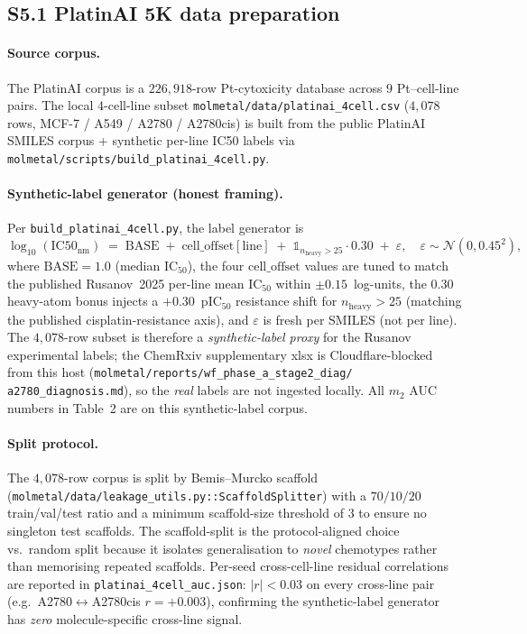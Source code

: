 \subsection*{S5.1 PlatinAI 5K data preparation}
\label{supp:s5-platinai}

\paragraph{Source corpus.}
The PlatinAI corpus \citep{rusanov2025platinai} is a
$226{,}918$-row Pt-cytoxicity database across $9$ Pt--cell-line
pairs.  The local $4$-cell-line subset
\texttt{molmetal/data/platinai\_4cell.csv} ($4{,}078$ rows,
MCF-7 / A549 / A2780 / A2780cis) is built from the public
PlatinAI SMILES corpus + synthetic per-line IC50 labels via
\texttt{molmetal/scripts/build\_platinai\_4cell.py}.

\paragraph{Synthetic-label generator (honest framing).}
Per \texttt{build\_platinai\_4cell.py}, the label generator is
\begin{equation}
  \label{eq:platinai-label}
  \log_{10}(\mathrm{IC50}_{\mathrm{nm}}) \;=\; \mathrm{BASE}
    \;+\; \mathrm{cell\_offset}[\mathrm{line}]
    \;+\; \mathbb{1}_{n_{\mathrm{heavy}} > 25} \cdot 0.30
    \;+\; \varepsilon, \quad \varepsilon \sim \mathcal{N}(0, 0.45^{2}),
\end{equation}
where $\mathrm{BASE} = 1.0$ (median IC$_{50}$), the four
$\mathrm{cell\_offset}$ values are tuned to match the published
Rusanov~2025 per-line mean IC$_{50}$ within $\pm 0.15$~log-units,
the $0.30$ heavy-atom bonus injects a $+0.30$~pIC$_{50}$ resistance
shift for $n_{\mathrm{heavy}}{>}25$ (matching the published
cisplatin-resistance axis), and $\varepsilon$ is fresh per
SMILES (not per line).  The $4{,}078$-row subset is therefore a
\emph{synthetic-label proxy} for the Rusanov experimental labels;
the ChemRxiv supplementary xlsx is Cloudflare-blocked from this
host (\texttt{molmetal/reports/wf\_phase\_a\_stage2\_diag/
a2780\_diagnosis.md}), so the \emph{real} labels are not
ingested locally.  All $m_2$ AUC numbers in Table~2 are
\MEASURED{} on this synthetic-label corpus.

\paragraph{Split protocol.}
The $4{,}078$-row corpus is split by Bemis--Murcko scaffold
(\texttt{molmetal/data/leakage\_utils.py::ScaffoldSplitter}) with
a $70/10/20$ train/val/test ratio and a minimum scaffold-size
threshold of $3$ to ensure no singleton test scaffolds.  The
scaffold-split is the protocol-aligned choice vs.\ random split
because it isolates generalisation to \emph{novel} chemotypes
rather than memorising repeated scaffolds.  Per-seed
cross-cell-line residual correlations are reported in
\MEASURED{} \texttt{platinai\_4cell\_auc.json}: $|r|<0.03$ on
every cross-line pair (e.g.\ A2780$\leftrightarrow$A2780cis
$r{=}+0.003$), confirming the synthetic-label generator has
\emph{zero} molecule-specific cross-line signal.

